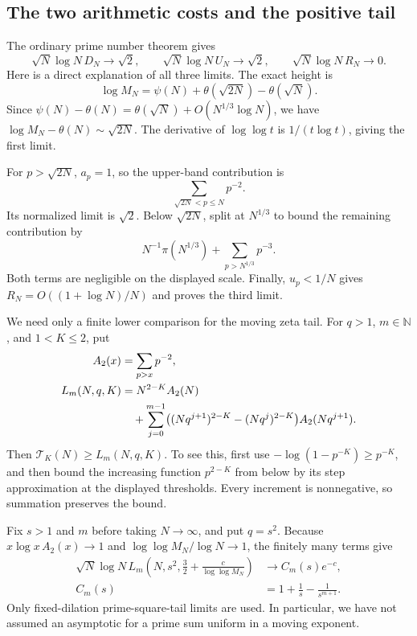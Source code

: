 \documentclass[11pt]{article}
\theoremstyle{definition}
\newcommand{\N}{\mathbb N}
\begin{document}
\subsection{The two arithmetic costs and the positive tail}
The ordinary prime number theorem gives
\begin{equation}\label{eq:lcm-cost-limits}
 \sqrt N\log N\,D_N\longrightarrow\sqrt2,\qquad
 \sqrt N\log N\,U_N\longrightarrow\sqrt2,\qquad
 \sqrt N\log N\,R_N\longrightarrow0.
\end{equation}
Here is a direct explanation of all three limits. The exact height is
\[
 \log M_N=\psi(N)+\theta(\sqrt{2N})-\theta(\sqrt N).
\]
Since $\psi(N)-\theta(N)=\theta(\sqrt N)+O(N^{1/3}\log N)$,
we have $\log M_N-\theta(N)\sim\sqrt{2N}$.
The derivative of $\log\log t$ is $1/(t\log t)$, giving the first limit.

For $p>\sqrt{2N}$, $a_p=1$, so the upper-band contribution is
\[
 \sum_{\sqrt{2N}<p\le N}p^{-2}.
\]
Its normalized limit is $\sqrt2$. Below $\sqrt{2N}$, split at
$N^{1/3}$ to bound the remaining contribution by
\[
 N^{-1}\pi(N^{1/3})+\sum_{p>N^{1/3}}p^{-3}.
\]
Both terms are negligible on the displayed scale. Finally,
$u_p<1/N$ gives $R_N=O((1+\log N)/N)$ and proves the third limit.

We need only a finite lower comparison for the moving zeta tail.
For $q>1$, $m\in\N$, and $1<K\le2$, put
\begin{align}
 A_2(x)&=\sum_{p>x}p^{-2},\notag\\
 L_m(N,q,K)&=N^{2-K}A_2(N)\notag\\
 &\quad+\sum_{j=0}^{m-1}
 \bigl((Nq^{j+1})^{2-K}-(Nq^j)^{2-K}\bigr)A_2(Nq^{j+1}).
 \label{eq:lcm-finite-tail}
\end{align}
Then $\mathcal T_K(N)\ge L_m(N,q,K)$. To see this, first use
$-\log(1-p^{-K})\ge p^{-K}$, and then bound the increasing function
$p^{2-K}$ from below by its step approximation at the displayed
thresholds. Every increment is nonnegative, so summation preserves
the bound.

Fix $s>1$ and $m$ before taking $N\to\infty$, and put $q=s^2$.
Because $x\log x\,A_2(x)\to1$ and
$\log\log M_N/\log N\to1$, the finitely many terms give
\begin{equation}\label{eq:lcm-finite-limit}
 \begin{aligned}
 \sqrt N\log N\,L_m\left(N,s^2,\frac32+
                        \frac c{\log\log M_N}\right)
     &\longrightarrow C_m(s)e^{-c},\\
 C_m(s)&=1+\frac1s-\frac1{s^{m+1}}.
 \end{aligned}
\end{equation}
Only fixed-dilation prime-square-tail limits are used. In particular,
we have not assumed an asymptotic for a prime sum uniform in a
moving exponent.
\end{document}
